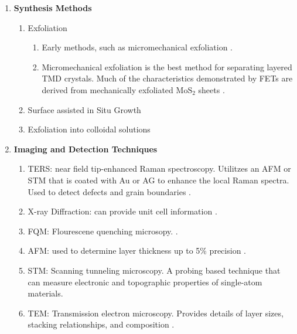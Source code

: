 \documentclass{article}
\begin{document}
\begin{enumerate}
\begin{enumerate}
		\end{enumerate} %

	\item{\textbf{Synthesis Methods}}
		\begin{enumerate} %
			\item{Exfoliation}
				\begin{enumerate}
					\item{Early methods, such as micromechanical exfoliation \cite{nanoscaleReview2011,acsnanoReview2013}.}
					\item{Micromechanical exfoliation is the best method for separating layered TMD crystals. Much of the characteristics demonstrated by FETs are derived from mechanically exfoliated $\mathrm{MoS}_2$ sheets \cite{grapheneLike2Dreview2013}.}
				\end{enumerate}
			\item{Surface assisted in Situ Growth}
			\item{Exfoliation into colloidal solutions}
		\end{enumerate} %

	\item{\textbf{Imaging and Detection Techniques}}
		\begin{enumerate}
			\item{TERS: near field tip-enhanced Raman spectroscopy. Utilitzes an AFM or STM that is coated with Au or AG to enhance the local Raman spectra. Used to detect defects and grain boundaries \cite{acsnanoReview2013}.}
			\item{X-ray Diffraction: can provide unit cell information \cite{acsnanoReview2013}.}
			\item{FQM: Flourescene quenching microsopy. \cite{acsnanoReview2013}.}
			\item{AFM: used to determine layer thickness up to 5\% precision \cite{acsnanoReview2013, Fukuda2008, Osada2011}.}
			\item{STM: Scanning tunneling microscopy. A probing based technique that can measure electronic and topographic properties of single-atom materials. }
			\item{TEM: Transmission electron microscopy. Provides details of layer sizes, stacking relationships, and composition \cite{acsnanoReview2013}.}
		\end{enumerate}



\end{enumerate}
\end{document}

